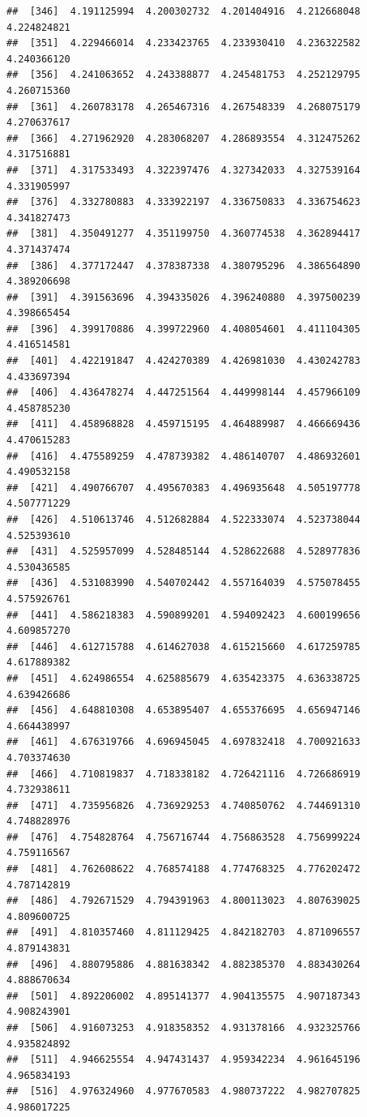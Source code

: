 \documentclass[
  11pt]{report}
\begin{document}
\begin{itemize}
\begin{verbatim}
##  [346]  4.191125994  4.200302732  4.201404916  4.212668048  4.224824821
##  [351]  4.229466014  4.233423765  4.233930410  4.236322582  4.240366120
##  [356]  4.241063652  4.243388877  4.245481753  4.252129795  4.260715360
##  [361]  4.260783178  4.265467316  4.267548339  4.268075179  4.270637617
##  [366]  4.271962920  4.283068207  4.286893554  4.312475262  4.317516881
##  [371]  4.317533493  4.322397476  4.327342033  4.327539164  4.331905997
##  [376]  4.332780883  4.333922197  4.336750833  4.336754623  4.341827473
##  [381]  4.350491277  4.351199750  4.360774538  4.362894417  4.371437474
##  [386]  4.377172447  4.378387338  4.380795296  4.386564890  4.389206698
##  [391]  4.391563696  4.394335026  4.396240880  4.397500239  4.398665454
##  [396]  4.399170886  4.399722960  4.408054601  4.411104305  4.416514581
##  [401]  4.422191847  4.424270389  4.426981030  4.430242783  4.433697394
##  [406]  4.436478274  4.447251564  4.449998144  4.457966109  4.458785230
##  [411]  4.458968828  4.459715195  4.464889987  4.466669436  4.470615283
##  [416]  4.475589259  4.478739382  4.486140707  4.486932601  4.490532158
##  [421]  4.490766707  4.495670383  4.496935648  4.505197778  4.507771229
##  [426]  4.510613746  4.512682884  4.522333074  4.523738044  4.525393610
##  [431]  4.525957099  4.528485144  4.528622688  4.528977836  4.530436585
##  [436]  4.531083990  4.540702442  4.557164039  4.575078455  4.575926761
##  [441]  4.586218383  4.590899201  4.594092423  4.600199656  4.609857270
##  [446]  4.612715788  4.614627038  4.615215660  4.617259785  4.617889382
##  [451]  4.624986554  4.625885679  4.635423375  4.636338725  4.639426686
##  [456]  4.648810308  4.653895407  4.655376695  4.656947146  4.664438997
##  [461]  4.676319766  4.696945045  4.697832418  4.700921633  4.703374630
##  [466]  4.710819837  4.718338182  4.726421116  4.726686919  4.732938611
##  [471]  4.735956826  4.736929253  4.740850762  4.744691310  4.748828976
##  [476]  4.754828764  4.756716744  4.756863528  4.756999224  4.759116567
##  [481]  4.762608622  4.768574188  4.774768325  4.776202472  4.787142819
##  [486]  4.792671529  4.794391963  4.800113023  4.807639025  4.809600725
##  [491]  4.810357460  4.811129425  4.842182703  4.871096557  4.879143831
##  [496]  4.880795886  4.881638342  4.882385370  4.883430264  4.888670634
##  [501]  4.892206002  4.895141377  4.904135575  4.907187343  4.908243901
##  [506]  4.916073253  4.918358352  4.931378166  4.932325766  4.935824892
##  [511]  4.946625554  4.947431437  4.959342234  4.961645196  4.965834193
##  [516]  4.976324960  4.977670583  4.980737222  4.982707825  4.986017225

\end{verbatim}
\end{itemize}
\end{document}
